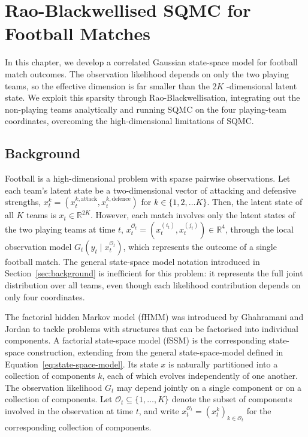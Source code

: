 \chapter{Rao-Blackwellised SQMC for Football Matches}
\label{ch:model}
In this chapter, we develop a correlated Gaussian state-space model for football match outcomes. The observation likelihood depends on only the two playing teams, so the effective dimension is far smaller than the $2K$ -dimensional latent state. We exploit this sparsity through Rao-Blackwellisation, integrating out the non-playing teams analytically and running SQMC on the four playing-team coordinates, overcoming the high-dimensional limitations of SQMC.


\section{Background}
\label{sec:rb-sqmc-background}
Football is a high-dimensional problem with sparse pairwise observations. Let each team's latent state be a two-dimensional vector of attacking and defensive strengths, $x_t^k = (x_t^{k, \text{attack}}, x_t^{k, \text{defence}})$ for $k \in \{1, 2, \ldots K\}$. Then, the latent state of all $K$ teams is $x_t \in \mathbb{R}^{2K}$. However, each match involves only the latent states of the two playing teams at time $t$, $x_t^{\mathcal{O}_t} = (x_t^{(i_t)}, x_t^{(j_t)}) \in \mathbb{R}^4$, through the local observation model $G_t(y_t \mid x_t^{\mathcal{O}_t})$, which represents the outcome of a single football match. The general state-space model notation introduced in Section~\ref{sec:background} is inefficient for this problem: it represents the full joint distribution over all teams, even though each likelihood contribution depends on only four coordinates.


The factorial hidden Markov model (fHMM) was introduced by Ghahramani and Jordan \citep{ghahramanijordan1995factorialhmm,ghahramanijordan1997factorialhmm} to tackle problems with structures that can be factorised into individual components. A factorial state-space model (fSSM) is the corresponding state-space construction, extending from the general state-space-model defined in Equation~\eqref{eq:state-space-model}. Its state $x$ is naturally partitioned into a collection of components $k$, each of which evolves independently of one another. The observation likelihood $G_t$ may depend jointly on a single component or on a collection of components. Let $\mathcal{O}_t \subseteq \{1,\ldots,K\}$ denote the subset of components involved in the observation at time $t$, and write $x_t^{\mathcal{O}_t} = (x_t^k)_{k \in \mathcal{O}_t}$ for the corresponding collection of components.


